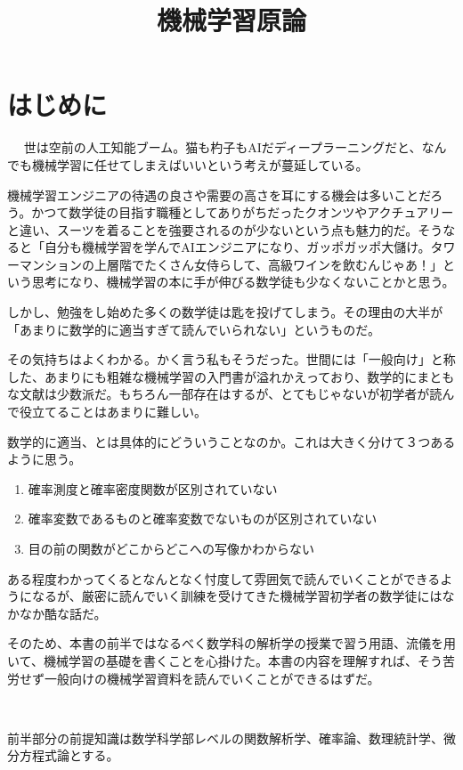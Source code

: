 \documentclass[dvipdfmx, a4paper]{jsarticle}
\title{機械学習原論}
\author{}
\begin{document}
\maketitle

\section{はじめに}　
世は空前の人工知能ブーム。猫も杓子もAIだディープラーニングだと、なんでも機械学習に任せてしまえばいいという考えが蔓延している。

機械学習エンジニアの待遇の良さや需要の高さを耳にする機会は多いことだろう。かつて数学徒の目指す職種としてありがちだったクオンツやアクチュアリーと違い、スーツを着ることを強要されるのが少ないという点も魅力的だ。そうなると「自分も機械学習を学んでAIエンジニアになり、ガッポガッポ大儲け。タワーマンションの上層階でたくさん女侍らして、高級ワインを飲むんじゃあ！」という思考になり、機械学習の本に手が伸びる数学徒も少なくないことかと思う。

しかし、勉強をし始めた多くの数学徒は匙を投げてしまう。その理由の大半が「あまりに数学的に適当すぎて読んでいられない」というものだ。

その気持ちはよくわかる。かく言う私もそうだった。世間には「一般向け」と称した、あまりにも粗雑な機械学習の入門書が溢れかえっており、数学的にまともな文献は少数派だ。もちろん一部存在はするが、とてもじゃないが初学者が読んで役立てることはあまりに難しい。

数学的に適当、とは具体的にどういうことなのか。これは大きく分けて３つあるように思う。

\begin{enumerate}
\item 確率測度と確率密度関数が区別されていない
\item 確率変数であるものと確率変数でないものが区別されていない
\item 目の前の関数がどこからどこへの写像かわからない
\end{enumerate}

ある程度わかってくるとなんとなく忖度して雰囲気で読んでいくことができるようになるが、厳密に読んでいく訓練を受けてきた機械学習初学者の数学徒にはなかなか酷な話だ。

そのため、本書の前半ではなるべく数学科の解析学の授業で習う用語、流儀を用いて、機械学習の基礎を書くことを心掛けた。本書の内容を理解すれば、そう苦労せず一般向けの機械学習資料を読んでいくことができるはずだ。

　

前半部分の前提知識は数学科学部レベルの関数解析学、確率論、数理統計学、微分方程式論とする。
\end{document}
